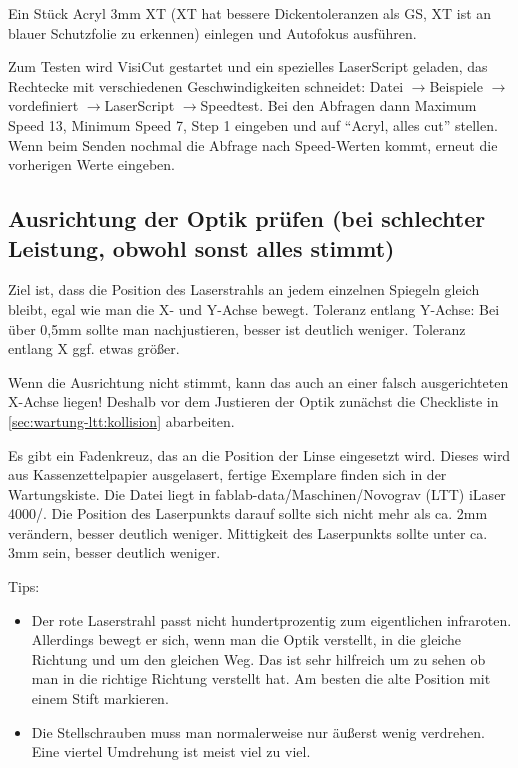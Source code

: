 \documentclass{\basedir/fablab-document}
\newcommand{\pfeil}{\ensuremath{\rightarrow}}
\begin{document}
Ein Stück Acryl 3mm XT (XT hat bessere Dickentoleranzen als GS, XT ist an blauer Schutzfolie zu erkennen) einlegen und Autofokus ausführen.

Zum Testen wird VisiCut gestartet und ein spezielles LaserScript geladen, das Rechtecke mit verschiedenen Geschwindigkeiten schneidet: Datei \pfeil Beispiele \pfeil vordefiniert \pfeil LaserScript \pfeil Speedtest. Bei den Abfragen dann Maximum Speed 13, Minimum Speed 7, Step 1 eingeben und auf \enquote{Acryl, alles cut} stellen. Wenn beim Senden nochmal die Abfrage nach Speed-Werten kommt, erneut die vorherigen Werte eingeben.




\subsection{Ausrichtung der Optik prüfen (bei schlechter Leistung, obwohl sonst alles stimmt)}\label{ltt-wartung-optik}
Ziel ist, dass die Position des Laserstrahls an jedem einzelnen Spiegeln gleich bleibt, egal wie man die X- und Y-Achse bewegt. Toleranz entlang Y-Achse: Bei über 0,5mm sollte man nachjustieren, besser ist deutlich weniger. Toleranz entlang X ggf. etwas größer.

Wenn die Ausrichtung nicht stimmt, kann das auch an einer falsch ausgerichteten X-Achse liegen! Deshalb vor dem Justieren der Optik zunächst die Checkliste in \cref{sec:wartung-ltt:kollision} abarbeiten.

Es gibt ein Fadenkreuz, das an die Position der Linse eingesetzt wird. Dieses wird aus Kassenzettelpapier ausgelasert, fertige Exemplare finden sich in der Wartungskiste. Die Datei liegt in fablab-data/Maschinen/Novograv (LTT) iLaser 4000/. Die Position des Laserpunkts darauf sollte sich nicht mehr als ca. 2mm verändern, besser deutlich weniger. Mittigkeit des Laserpunkts sollte unter ca. 3mm sein, besser deutlich weniger.

Tips:
\begin{itemize}
	\item Der rote Laserstrahl passt nicht hundertprozentig zum eigentlichen infraroten. Allerdings bewegt er sich, wenn man die Optik verstellt, in die gleiche Richtung und um den gleichen Weg. Das ist sehr hilfreich um zu sehen ob man in die richtige Richtung verstellt hat. Am besten die alte Position mit einem Stift markieren.

	\item Die Stellschrauben muss man normalerweise nur äußerst wenig verdrehen. Eine viertel Umdrehung ist meist viel zu viel.
\end{itemize}
\end{document}
